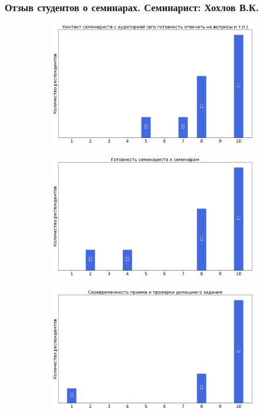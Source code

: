    \subsubsection{Отзыв студентов о семинарах. Семинарист: Хохлов В.К.}
		\begin{figure}[H]
			\centering
			\begin{subfigure}[b]{0.45\textwidth}
				\centering
				\includegraphics[width=\textwidth]{images/1 course/Информатика/seminarists-marks-Хохлов В.К.-0.png}
			\end{subfigure}
			\begin{subfigure}[b]{0.45\textwidth}
				\centering
				\includegraphics[width=\textwidth]{images/1 course/Информатика/seminarists-marks-Хохлов В.К.-1.png}
			\end{subfigure}
			\begin{subfigure}[b]{0.45\textwidth}
				\centering
				\includegraphics[width=\textwidth]{images/1 course/Информатика/seminarists-marks-Хохлов В.К.-2.png}

\end{subfigure}
\end{figure}
